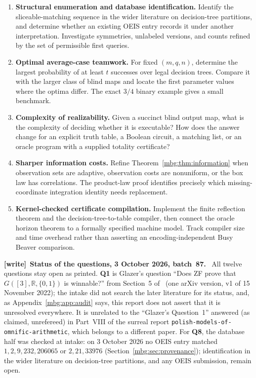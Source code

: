 \documentclass[11pt,letterpaper]{article}
\theoremstyle{definition}
\newenvironment{writenote}[1][]{\par\smallskip\begingroup\small
 \noindent\textbf{[write]}\if\relax\detokenize{#1}\relax\else~\textbf{#1.}\fi\ }%
 {\par\endgroup\smallskip}
\begin{document}
\begin{enumerate}[label=\textbf{Q\arabic*.},leftmargin=2.7em,itemsep=0.65em]
\item \textbf{Structural enumeration and database identification.}
Identify the sliceable-matching sequence in the wider literature on decision-tree partitions, and determine whether an existing OEIS entry records it under another interpretation. Investigate symmetries, unlabeled versions, and counts refined by the set of permissible first queries.

\item \textbf{Optimal average-case teamwork.}
For fixed $(m,q,n)$, determine the largest probability of at least $t$ successes over legal decision trees. Compare it with the larger class of blind maps and locate the first parameter values where the optima differ. The exact $3/4$ binary example gives a small benchmark.

\item \textbf{Complexity of realizability.}
Given a succinct blind output map, what is the complexity of deciding whether it is executable? How does the answer change for an explicit truth table, a Boolean circuit, a matching list, or an oracle program with a supplied totality certificate?

\item \textbf{Sharper information costs.}
Refine Theorem~\ref{mbg:thm:information} when observation sets are adaptive, observation costs are nonuniform, or the box law has correlations. The product-law proof identifies precisely which missing-coordinate integration identity needs replacement.

\item \textbf{Kernel-checked certificate compilation.}
Implement the finite reflection theorem and the decision-tree-to-table compiler, then connect the oracle horizon theorem to a formally specified machine model. Track compiler size and time overhead rather than asserting an encoding-independent Busy Beaver comparison.
\end{enumerate}

\begin{writenote}[Status of the questions, 3 October 2026, batch~87]
All twelve questions stay open as printed. \textbf{Q1} is Glazer's question ``Does ZF prove that $G([3],\mathbb R,\{0,1\})$ is winnable?'' from Section~5 of~\cite{GlazerBox} (one arXiv version, v1 of 15 November 2022); the intake did not search the later literature for its status, and, as Appendix~\ref{mbg:app:audit} says, this report does not assert that it is unresolved everywhere. It is unrelated to the ``Glazer's Question~1'' answered (as claimed, unrefereed) in Part~VIII of the surreal report \nolinkurl{polish-models-of-omnific-arithmetic}, which belongs to a different paper. For \textbf{Q8}, the database half was checked at intake: on 3 October 2026 no OEIS entry matched $1,2,9,232,206065$ or $2,21,33976$ (Section~\ref{mbg:sec:provenance}); identification in the wider literature on decision-tree partitions, and any OEIS submission, remain open.
\end{writenote}
\end{document}
